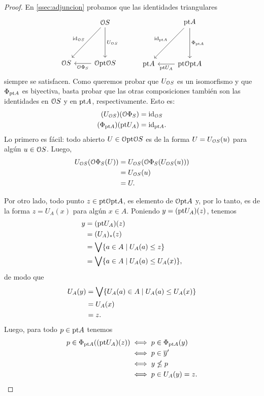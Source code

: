 \begin{proof}
    En \ref{ssec:adjuncion} probamos que
    las identidades triangulares
    \[
        \begin{tikzcd}[row sep=15mm]
            & \cal OS \ar[d,"U_{\cal OS}"] \ar[dl,"\id_{\cal OS}"']
            \\
            \cal OS
            & \cal O\pt\cal OS \ar[l,"\cal O\Phi_S"]
        \end{tikzcd}
        \hspace{10mm}
        \begin{tikzcd}[row sep=15mm]
            & \pt A \ar[d,"\Phi_{\pt A}"] \ar[dl,"\id_{\pt A}"']
            \\
            \pt A
            & \pt \cal O\pt A \ar[l,"\pt U_A"]
        \end{tikzcd}
    \]
    siempre se satisfacen.
    Como queremos probar que $U_{\cal OS}$ es un isomorfismo
    y que $\Phi_{\pt A}$ es biyectiva,
    basta probar que las otras composiciones también son
    las identidades en $\cal OS$ y en $\pt A$, respectivamente.
    Esto es:
    \begin{align*}
        (U_{\cal OS})(\cal O\Phi_S) &= \id_{\cal OS} \\
        (\Phi_{\pt A})(\pt U_A) &= \id_{\pt A}.
    \end{align*}
    Lo primero es fácil:
    todo abierto $U\in\cal O\pt\cal OS$ es de la forma
    $U=U_{\cal OS}(u)$ para algún $u\in\cal OS$.
    Luego,
    \begin{align*}
        U_{\cal OS}(\cal O\Phi_S(U))
        &= U_{\cal OS}(\cal O\Phi_S(U_{\cal OS}(u))) \\
        &= U_{\cal OS}(u) \\
        &= U.
    \end{align*}
    
    Por otro lado, todo punto $z\in\pt\cal O\pt A$,
    es elemento de $\cal O\pt A$ y, por lo tanto,
    es de la forma $z=U_A(x)$ para algún $x\in A$.
    Poniendo $y=(\pt U_A)(z)$, tenemos
    \begin{align*}
        y
        &= (\pt U_A)(z) \\
        &= (U_A)_*(z) \\
        &= \Sup\{a\in A\mid U_A(a)\leq z\} \\
        &= \Sup\{a\in A\mid U_A(a)\leq U_A(x)\},
    \end{align*}
    de modo que
    \begin{align*}
        U_A(y)
        &= \Sup\{U_A(a)\in A\mid U_A(a)\leq U_A(x)\} \\
        &= U_A(x) \\
        &= z.
    \end{align*}
    Luego, para todo $p\in\pt A$ tenemos
    \begin{align*}
        p\in\Phi_{\pt A}((\pt U_A)(z))
        &\iff p\in \Phi_{\pt A}(y) \\
        &\iff p\in \ol{y}' \\
        &\iff y\nleq p \\
        &\iff p\in U_A(y) = z.
    \end{align*}
\end{proof}

